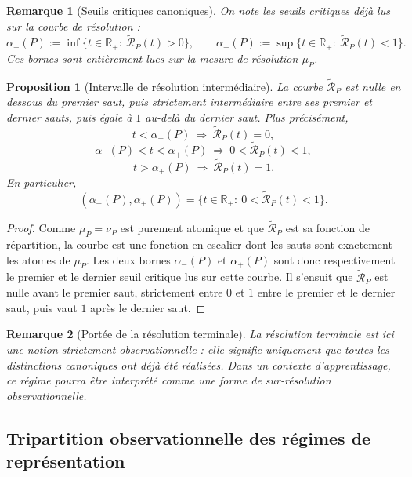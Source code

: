 \documentclass[11pt,a4paper]{article}
\newtheorem{proposition}{Proposition}
\newtheorem{remark}{Remarque}
\begin{document}
\begin{appendices}
\begin{remark}[Seuils critiques canoniques]
On note les seuils critiques déjà lus sur la courbe de résolution :
\[
\alpha_-(P):=\inf\{t\in\mathbb R_+:\ \widetilde{\mathcal R}_P(t)>0\},
\qquad
\alpha_+(P):=\sup\{t\in\mathbb R_+:\ \widetilde{\mathcal R}_P(t)<1\}.
\]
Ces bornes sont entièrement lues sur la mesure de résolution \(\mu_P\).
\end{remark}

\begin{proposition}[Intervalle de résolution intermédiaire]
La courbe \(\widetilde{\mathcal R}_P\) est nulle en dessous du premier saut, puis strictement intermédiaire entre ses premier et dernier sauts, puis égale à \(1\) au-delà du dernier saut. Plus précisément,
\[
t<\alpha_-(P)\ \Longrightarrow\ \widetilde{\mathcal R}_P(t)=0,
\]
\[
\alpha_-(P)<t<\alpha_+(P)\ \Longrightarrow\ 0<\widetilde{\mathcal R}_P(t)<1,
\]
\[
t>\alpha_+(P)\ \Longrightarrow\ \widetilde{\mathcal R}_P(t)=1.
\]
En particulier,
\[
(\alpha_-(P),\alpha_+(P))=\{t\in\mathbb R_+:\ 0<\widetilde{\mathcal R}_P(t)<1\}.
\]
\end{proposition}

\begin{proof}
Comme \(\mu_P=\nu_P\) est purement atomique et que \(\widetilde{\mathcal R}_P\) est sa fonction de répartition, la courbe est une fonction en escalier dont les sauts sont exactement les atomes de \(\mu_P\). Les deux bornes \(\alpha_-(P)\) et \(\alpha_+(P)\) sont donc respectivement le premier et le dernier seuil critique lus sur cette courbe. Il s'ensuit que \(\widetilde{\mathcal R}_P\) est nulle avant le premier saut, strictement entre \(0\) et \(1\) entre le premier et le dernier saut, puis vaut \(1\) après le dernier saut.
\end{proof}

\begin{remark}[Portée de la résolution terminale]
La résolution terminale est ici une notion strictement observationnelle : elle signifie uniquement que toutes les distinctions canoniques ont déjà été réalisées. Dans un contexte d'apprentissage, ce régime pourra être interprété comme une forme de sur-résolution observationnelle.
\end{remark}

\subsection{Tripartition observationnelle des régimes de représentation}


\end{appendices}
\end{document}
